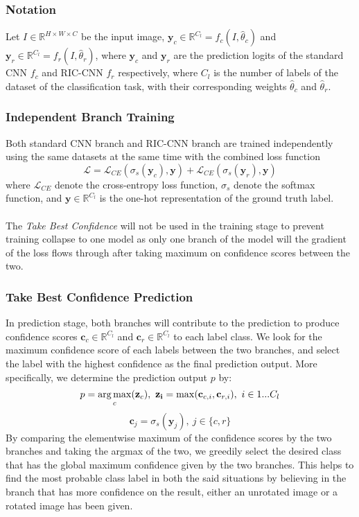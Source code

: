 \subsubsection{Notation}
Let $I \in \mathbb{R}^{H \times W \times C}$ be the input image, $\mathbf{y}_c \in \mathbb{R}^{C_l} = f_c(I, \hat{\theta}_c)$ and $\mathbf{y}_r \in \mathbb{R}^{C_l} = f_r(I, \hat{\theta}_r)$, where $\mathbf{y}_c$ and $\mathbf{y}_r$ are the prediction logits of the standard CNN $f_c$ and RIC-CNN $f_r$ respectively, where $C_l$ is the number of labels of the dataset of the classification task, with their corresponding weights $\hat{\theta}_c$ and $\hat{\theta}_r$.

\subsubsection{Independent Branch Training}
Both standard CNN branch and RIC-CNN branch are trained independently using the same datasets at the same time with the combined loss function
$$
\mathcal{L} = \mathcal{L}_{CE}(\sigma_s(\mathbf{y}_c), \mathbf{y}) + \mathcal{L}_{CE}(\sigma_s(\mathbf{y}_r), \mathbf{y})
$$
where $\mathcal{L}_{CE}$ denote the cross-entropy loss function, $\sigma_s$ denote the softmax function, and $\mathbf{y} \in \mathbb{R}^{C_l}$ is the one-hot representation of the ground truth label.
\\ \\
The \textit{Take Best Confidence} will not be used in the training stage to prevent training collapse to one model as only one branch of the model will the gradient of the loss flows through after taking maximum on confidence scores between the two.

\subsubsection{Take Best Confidence Prediction}
In prediction stage, both branches will contribute to the prediction to produce confidence scores $\mathbf{c}_c \in \mathbb{R}^{C_l}$ and $\mathbf{c}_r \in \mathbb{R}^{C_l}$ to each label class. We look for the maximum confidence score of each labels between the two branches, and select the label with the highest confidence as the final prediction output.
More specifically, we determine the prediction output $p$ by:
$$
p = \argmax_c(\mathbf{z}_c),\ \mathbf{z_i} = \max(\mathbf{c}_{c,i}, \mathbf{c}_{r,i}),\ i \in 1...C_l
$$
$$
\mathbf{c}_j = \sigma_s(\mathbf{y}_j),\ j \in \{c, r\}
$$
By comparing the elementwise maximum of the confidence scores by the two branches and taking the argmax of the two, we greedily select the desired class that has the global maximum confidence given by the two branches. This helps to find the most probable class label in both the said situations by believing in the branch that has more confidence on the result, either an unrotated image or a rotated image has been given.
